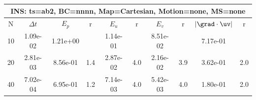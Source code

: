 
\begin{tabular}{|c|c|c|c|c|c|c|c|c|c|} \hline
 \multicolumn{10}{|c|}{INS: ts=ab2, BC=nnnn, Map=Cartesian, Motion=none, MS=none } \\ \hline 
     N  &   $\Delta t$ & $E_p$   &  r  &   $E_u$   &   r    &   $E_v$   & r   &  $|\grad\cdot\uv|$  & r   \\ \hline 
  10   &  1.09e-02  &   1.21e+00  &        &   1.14e-01  &        &   8.51e-02  &        &   7.17e-01  &        \\ 
  20   &  2.81e-03  &   8.56e-01  & 1.4  &   2.87e-02  & 4.0  &   2.16e-02  & 3.9  &   3.62e-01  & 2.0  \\ 
  40   &  7.02e-04  &   6.95e-01  & 1.2  &   7.14e-03  & 4.0  &   5.42e-03  & 4.0  &   1.80e-01  & 2.0  \\ 
 \hline 
\end{tabular}
